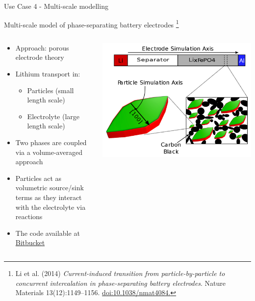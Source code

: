 \documentclass[compress,newPxFont,sthlmFooter]{beamer}
\begin{document}
\begin{frame}[plain]{Use Case 4 - Multi-scale modelling}
    \begin{center}
        \alert{Multi-scale model of phase-separating battery electrodes}
        \footnote{\tiny{Li et al. (2014) \textit{Current-induced transition
                    from particle-by-particle to concurrent intercalation in phase-separating battery electrodes}.
                    Nature Materials 13(12):1149–1156. \href{https://doi.org/10.1038/nmat4084}{doi:10.1038/nmat4084.}}
                }
     \end{center}  
    \begin{columns}[c]
      \begin{column}{0.6\textwidth}
        {\small
         \begin{itemize}
            \item Approach: \alert{porous electrode theory}
            \item Lithium transport in:
            \begin{itemize}
                \item Particles (small length scale)
                \item Electrolyte (large length scale)
            \end{itemize}
            \item Two phases are coupled via a volume-averaged approach
            \item Particles act as volumetric source/sink terms as they interact with the
                  electrolyte via reactions
            \item The code available at \alert{\href{https://bitbucket.org/bazantgroup/mpet}{Bitbucket}}
        \end{itemize}
        }
      \end{column}
      
      \begin{column}{0.4\textwidth}
        \begin{center}
          \includegraphics[align=c, width=\textwidth]{multi_scale.png}
        \end{center}
      \end{column}
    \end{columns}
\end{frame}
\end{document}

